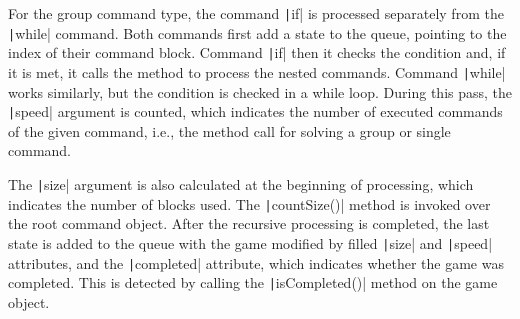 For the group command type, the command \texttt|if| is processed separately from the \texttt|while| command.
Both commands first add a state to the queue, pointing to the index of their command block.
Command \texttt|if| then it checks the condition and, if it is met, it calls the method to process the nested commands.
Command \texttt|while| works similarly, but the condition is checked in a while loop.
During this pass, the \texttt|speed| argument is counted, which indicates the number of executed commands of the given command, i.e., the method call for solving a group or single command.

The \texttt|size| argument is also calculated at the beginning of processing, which indicates the number of blocks used.
The \texttt|countSize()| method is invoked over the root command object.
After the recursive processing is completed, the last state is added to the queue with the game modified by filled \texttt|size| and \texttt|speed| attributes, and the \texttt|completed| attribute, which indicates whether the game was completed.
This is detected by calling the \texttt|isCompleted()| method on the game object.
